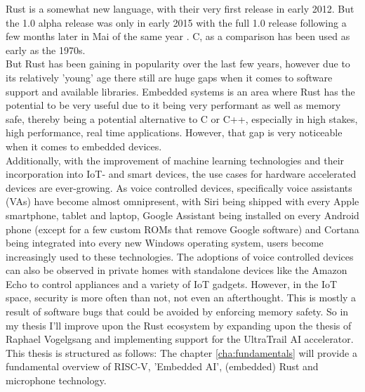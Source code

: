 

Rust \cite{rustlang} is a somewhat new language, with their very first release in early 2012.
But the 1.0 alpha release was only in early 2015 with the full 1.0 release following a few
months later in Mai of the same year \cite{rust_releases}.
C, as a comparison has been used as early as the 1970s.\\
But Rust has been gaining in popularity \cite{rust_popularity} over the last few years, however
due to its relatively 'young' age there still are huge gaps when it comes to software support and available libraries.
Embedded systems is an area where Rust has the potential to be very useful due to it being very performant as well as memory safe,
thereby being a potential alternative to C or C++, especially in high stakes, high performance, real time applications.
However, that gap is very noticeable when it comes to embedded devices.\\
Additionally, with the improvement of machine learning technologies and their incorporation into IoT- and smart devices,
the use cases for hardware accelerated devices are ever-growing.
As voice controlled devices, specifically voice assistants (VAs) have become almost omnipresent,
with Siri being shipped with every Apple smartphone, tablet and laptop, Google Assistant being installed
on every Android phone (except for a few custom ROMs that remove Google software) and Cortana being integrated
into every new Windows operating system, users become increasingly used to these technologies.
The adoptions of voice controlled devices can also be observed in private homes with standalone
devices like the Amazon Echo to control appliances and a variety of IoT gadgets.
However, in the IoT space, security is more often than not, not even an afterthought.
This is mostly a result of software bugs that could be avoided by enforcing memory safety.
So in my thesis I'll improve upon the Rust ecosystem by expanding upon the thesis of Raphael Vogelgsang \cite{rust_pulp}
and implementing support for the UltraTrail \cite{ultratrail} AI accelerator.
\newpage
This thesis is structured as follows:
The chapter \ref{cha:fundamentals} will provide a fundamental overview of RISC-V, 'Embedded AI', (embedded) Rust and microphone technology.\\
